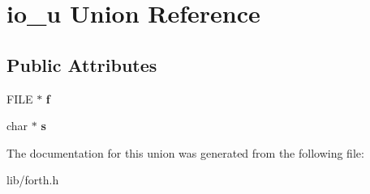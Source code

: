 \hypertarget{unionio__u}{\section{io\-\_\-u Union Reference}
\label{unionio__u}
}
\subsection*{Public Attributes}
\begin{DoxyCompactItemize}
\item 
\hypertarget{unionio__u_a20295527afdca25a562f0e94b8eb7372}{F\-I\-L\-E $\ast$ {\bfseries f}}\label{unionio__u_a20295527afdca25a562f0e94b8eb7372}

\item 
\hypertarget{unionio__u_af2ba735a875960b4c28a64b204f8951d}{char $\ast$ {\bfseries s}}\label{unionio__u_af2ba735a875960b4c28a64b204f8951d}

\end{DoxyCompactItemize}


The documentation for this union was generated from the following file\-:\begin{DoxyCompactItemize}
\item 
lib/forth.\-h\end{DoxyCompactItemize}
